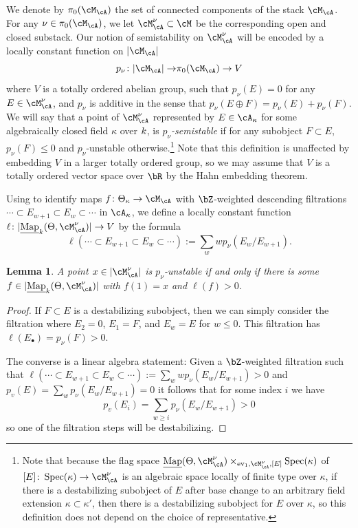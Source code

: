 \documentclass[a4paper]{amsart}
\numberwithin{equation}{section}
\theoremstyle{plain}
\newtheorem{lem}[thm]{Lemma}
\theoremstyle{definition}
\DeclareMathOperator{\Spec}{Spec}
\DeclareMathOperator{\ev}{ev}
\newcommand{\uMap}{\underline{{\rm Map}}}
\newcommand{\co}{\colon}
\def\p{p}
\begin{document}
{We denote by $\pi_0(\cM_\cA)$ the set of connected components of the stack $\cM_\cA$}. For any  $\nu \in \pi_0(\cM_\cA)$, we let $\cM_{\cA}^\nu \subset \cM$ be the corresponding open and closed substack. Our notion of semistability on $\cM_\cA^\nu$ will be encoded by a locally constant function on $|\cM_\cA|$
\[
\p_\nu \co {|\cM_\cA|\to} \pi_0(\cM_\cA) \to V
\]
where $V$ is a totally ordered abelian group, {such that} $\p_\nu(E) = 0$ for any $E \in \cM_\cA^\nu$, and $\p_{\nu}$ is additive in the sense that $\p_\nu(E \oplus F) = \p_{\nu}(E) + \p_\nu(F)$. We will say that a point of $\cM_\cA^\nu$ represented by $E \in \cA_\kappa$ for some algebraically closed field $\kappa$ over ${k}$, is \emph{$p_\nu$-semistable} if for any subobject $F \subset E$, $\p_\nu(F) \leq 0$ and $p_\nu$-unstable otherwise.\footnote{Note that because the flag space $\uMap(\Theta, \cM_{\cA}^\nu) \times_{\ev_1, \cM_{\cA}^\nu, [E]} \Spec(\kappa)$ of $[E] \co \Spec(\kappa) \to \cM_{\cA}^\nu$  is an algebraic space locally of finite type over $\kappa$, if there is a destabilizing subobject of $E$ after base change to an arbitrary field extension $\kappa \subset \kappa'$, then there is a destabilizing subobject for $E$ over $\kappa$, so this definition does not depend on the choice of representative.} Note that this definition is unaffected by embedding $V$ in a larger totally ordered group, so we may assume that $V$ is a totally ordered vector space over $\bR$ by the Hahn embedding theorem.

Using  to identify maps $f \co \Theta_\kappa \to \cM_\cA$ with $\bZ$-weighted descending filtrations $\cdots \subset E_{w+1} \subset E_w \subset\cdots$ in $\cA_{\kappa}$, we define a locally constant function $\ell \co |\uMap_{\base}(\Theta,\cM_\cA^\nu)| \to V$ by the formula
\[
\ell(\cdots \subset E_{w+1} \subset E_w \subset \cdots) := \sum_w w \p_\nu(E_w / E_{w+1}).
\]
\begin{lem}
	A point $x \in |\cM_\cA^\nu|$ is $p_\nu$-unstable if and only if there is some $f \in |\uMap_{\base}(\Theta,\cM_{\cA}^\nu)|$ with $f(1) = x$ and $\ell(f)>0$.
\end{lem}
\begin{proof}
	If $F \subset E$ is a destabilizing subobject, then we can simply consider the filtration where $E_2=0$, $E_1=F$, and $E_w = E$ for $w \leq 0$. This filtration has $\ell(E_\bullet) = {p_\nu(F)}>0$. 
	
	The converse is a linear algebra statement: Given a $\bZ$-weighted filtration such that $\ell(\cdots \subset E_{w+1} \subset E_w \subset \cdots) := \sum_w w \p_\nu(E_w / E_{w+1})>0$ and $\p_v(E) = \sum_w \p_\nu(E_w / E_{w+1})=0$  it follows that for some index $i$ we have $$\p_v(E_i) = \sum_{w\geq i} \p_\nu(E_w / E_{w+1})>0$$
	so one of the filtration steps will be destabilizing.
\end{proof}
\end{document}
